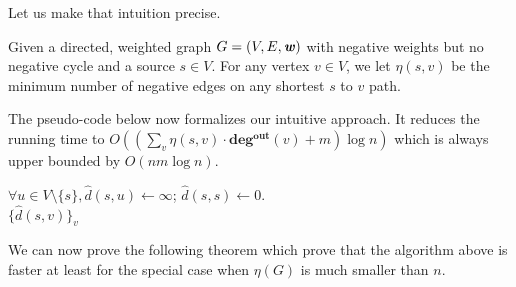 Let us make that intuition precise.

\begin{definition}
Given a directed, weighted graph $G=(V,E,\boldsymbol{\mathit{w}})$ with negative weights but no negative cycle and a source $s \in V$. For any vertex $v \in V$, we let $\eta(s,v)$ be the minimum number of negative edges on any shortest $s$ to $v$ path. 
\end{definition}

The pseudo-code below now formalizes our intuitive approach. It reduces the running time to $O((\sum_v \eta(s,v) \cdot \mathbf{deg^{out}}(v) + m) \log n)$ which is always upper bounded by $O(nm \log n)$.

\begin{algorithm}
$\forall u \in V \setminus \{s\}, \hat{d}(s, u) \gets \infty$; $\hat{d}(s,s) \gets 0$.\\
\Return $\{\hat{d}(s, v) \}_v$
\caption{$\textsc{HeuristicBellmanFord}(G,s)$}
\label{alg:embellishedBellmanFord}
\end{algorithm}

We can now prove the following theorem which prove that the algorithm above is faster at least for the special case when $\eta(G)$ is much smaller than $n$.

